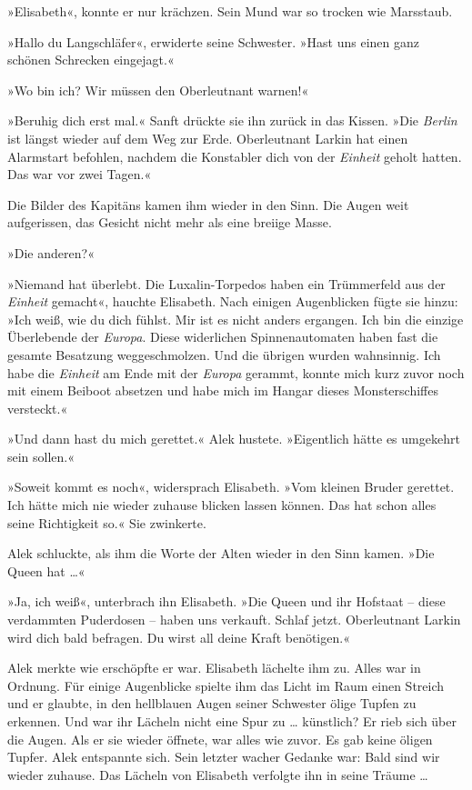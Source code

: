 \bigpar

»Elisabeth«, konnte er nur krächzen. Sein Mund war so trocken wie
Marsstaub.

»Hallo du Langschläfer«, erwiderte seine Schwester. »Hast uns einen
ganz schönen Schrecken eingejagt.«

»Wo bin ich? Wir müssen den Oberleutnant warnen!«

»Beruhig dich erst mal.« Sanft drückte sie ihn zurück in das
Kissen. »Die \textit{Berlin} ist längst wieder auf dem Weg zur Erde.
Oberleutnant Larkin hat einen Alarmstart befohlen, nachdem die
Konstabler dich von der \textit{Einheit} geholt hatten. Das war vor zwei
Tagen.«

Die Bilder des Kapitäns kamen ihm wieder in den Sinn. Die Augen
weit aufgerissen, das Gesicht nicht mehr als eine breiige Masse.

»Die anderen?«

»Niemand hat überlebt. Die Luxalin-Torpedos haben ein Trümmerfeld
aus der \textit{Einheit} gemacht«, hauchte Elisabeth. Nach einigen
Augenblicken fügte sie hinzu: »Ich weiß, wie du dich fühlst. Mir
ist es nicht anders ergangen. Ich bin die einzige Überlebende der
\textit{Europa}. Diese widerlichen Spinnenautomaten haben fast die gesamte
Besatzung weggeschmolzen. Und die übrigen wurden wahnsinnig. Ich
habe die \textit{Einheit} am Ende mit der \textit{Europa} gerammt, konnte mich kurz
zuvor noch mit einem Beiboot absetzen und habe mich im Hangar
dieses Monsterschiffes versteckt.«

»Und dann hast du mich gerettet.« Alek hustete. »Eigentlich hätte
es umgekehrt sein sollen.«

»Soweit kommt es noch«, widersprach Elisabeth. »Vom kleinen Bruder
gerettet. Ich hätte mich nie wieder zuhause blicken lassen können.
Das hat schon alles seine Richtigkeit so.« Sie zwinkerte.

Alek schluckte, als ihm die Worte der Alten wieder in den Sinn
kamen. »Die Queen hat \ldots{}«

»Ja, ich weiß«, unterbrach ihn Elisabeth. »Die Queen und ihr
Hofstaat – diese verdammten Puderdosen – haben uns verkauft. Schlaf
jetzt. Oberleutnant Larkin wird dich bald befragen. Du wirst all
deine Kraft benötigen.«

Alek merkte wie erschöpfte er war. Elisabeth lächelte ihm zu. Alles
war in Ordnung. Für einige Augenblicke spielte ihm das Licht im
Raum einen Streich und er glaubte, in den hellblauen Augen seiner
Schwester ölige Tupfen zu erkennen. Und war ihr Lächeln nicht eine
Spur zu … künstlich? Er rieb sich über die Augen. Als er sie wieder
öffnete, war alles wie zuvor. Es gab keine öligen Tupfer. Alek
entspannte sich. Sein letzter wacher Gedanke war: Bald sind wir
wieder zuhause. Das Lächeln von Elisabeth verfolgte ihn in seine
Träume …



